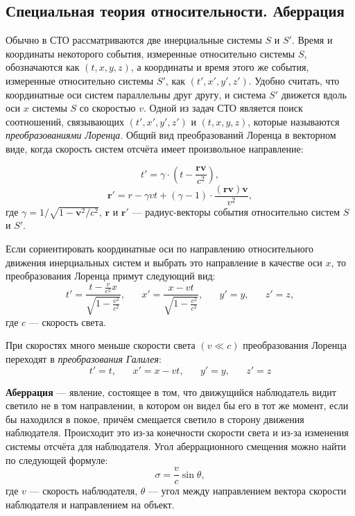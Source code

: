 \subsection{Специальная теория относительности. Аберрация}

Обычно в СТО рассматриваются две инерциальные системы $S$ и $S'$. Время и координаты некоторого события, измеренные относительно системы $S$, обозначаются как $(t, x, y, z)$, а координаты и время этого же события, измеренные относительно системы $S'$, как $(t', x', y', z')$. Удобно считать, что координатные оси систем параллельны друг другу, и система $S'$ движется вдоль оси $x$ системы $S$ со скоростью $v$. Одной из задач СТО является поиск соотношений, связывающих $(t', x', y', z')$ и $(t, x, y, z)$, которые называются \textit{преобразованиями Лоренца}. Общий вид преобразований Лоренца в векторном виде, когда скорость систем отсчёта имеет произвольное направление:

\begin{equation}
t'=\gamma\cdot \left(t-\frac{\mathbf{rv}}{c^2}\right),
\end{equation}
\begin{equation}
\mathbf{r'}=r-\gamma vt+(\gamma-1)\cdot\frac{(\mathbf{rv})\mathbf{v}}{v^2},
\end{equation}
где  $\gamma=1/{\sqrt {1-\mathbf {v} ^{2}/c^{2}}}$, $\mathbf{r}$ и $\mathbf{r'}$ --- радиус-векторы события относительно систем $S$ и $S'$.

Если сориентировать координатные оси по направлению относительного движения инерциальных систем и выбрать это направление в качестве оси $x$, то преобразования Лоренца примут следующий вид: 
\begin{equation}
t'=\frac{t-\frac{v}{c^2}x}{\sqrt{1-\frac{v^2}{c^2}}},\quad\text{  } x'=\frac{x-vt}{\sqrt{1-\frac{v^2}{c^2}}},\quad\text{  } y'=y,\quad\text{  } z'=z,
\end{equation}
где $c$ --- скорость света.

 При скоростях много меньше скорости света $(v\ll c)$ преобразования Лоренца переходят в \textit{преобразования Галилея}:
\begin{equation}
 t'=t,\quad\text{  } x'=x-vt,\quad\text{  }  y'=y,\quad\text{  }  z'=z
\end{equation}
 
\textbf{Аберрация} --- явление, состоящее в том, что движущийся наблюдатель видит светило не в том направлении, в котором он видел бы его в тот же момент, если бы находился в покое, причём смещается светило в сторону движения наблюдателя. Происходит это из-за конечности скорости света и из-за изменения системы отсчёта для наблюдателя.  
Угол аберрационного смещения можно найти по следующей формуле:
\begin{equation}\sigma=\frac{v}{c}\sin\theta,
\end{equation}
где $v$ --- скорость наблюдателя, $\theta$ --- угол между направлением вектора скорости наблюдателя и направлением на объект. 